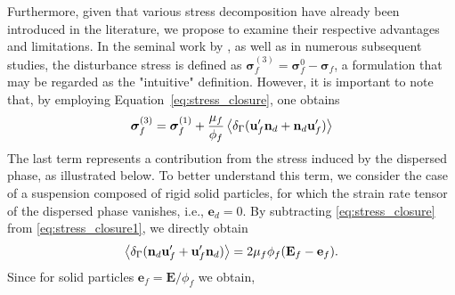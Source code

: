 Furthermore, given that various stress decomposition have already been introduced in the literature, we propose to examine their respective advantages and limitations. 
In the seminal work by \citet{zhang1997momentum}, as well as in numerous subsequent studies, the disturbance stress is defined as $\bm\sigma_f^{(3)} = \bm\sigma_f^0 - \bm\sigma_f$, a formulation that may be regarded as the "intuitive" definition. 
However, it is important to note that, by employing Equation~\ref{eq:stress_closure}, one obtains
\begin{equation}
    \bm\sigma_f^{(3)}
    = \bm \sigma _f ^{(1)}
    + \frac{\mu_f}{\phi_f} \avg{\delta_\Gamma( \textbf{u}_f'  \textbf{n}_d +  \textbf{n}_d \textbf{u}_f' )}
    \label{eq:stress_closure_zhang}
\end{equation}
The last term represents a contribution from the stress induced by the dispersed phase, as illustrated below. 
To better understand this term, we consider the case of a suspension composed of rigid solid particles, for which the strain rate tensor of the dispersed phase vanishes, i.e., $\textbf{e}_d = 0$.
By subtracting \ref{eq:stress_closure} from \ref{eq:stress_closure1}, we directly obtain
\begin{equation}
    \left<\delta_\Gamma (\textbf{n}_d \textbf{u}_f'+  \textbf{u}_f' \textbf{n}_d)\right>
    = 2 \mu _f \phi _f (\textbf{E}_f - \textbf{e} _f).
\end{equation} 
Since for solid particles $\textbf{e} _f = \textbf{E}/\phi _f$ we obtain,
